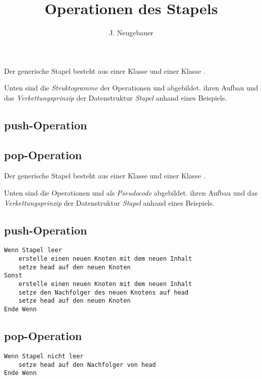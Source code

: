 \documentclass[10pt, a4paper]{scrartcl}
\author{J. Neugebauer}
\title{Operationen des Stapels}
\date{\Heute}
\begin{document}
\ReiheTitel

Der generische Stapel besteht aus einer Klasse  und einer Klasse .


\begin{aufgabe}
	Unten sind die \emph{Struktogramme} der Operationen  und  abgebildet.  ihren Aufbau und   das \emph{Verkettungsprinzip} der Datenstruktur \emph{Stapel} anhand eines Beispiels.

\subsection*{push-Operation}

\subsection*{pop-Operation}
\end{aufgabe}

\clearpage

\ReiheTitel

Der generische Stapel besteht aus einer Klasse  und einer Klasse .


\begin{aufgabe}
	Unten sind die Operationen  und  als \emph{Pseudocode} abgebildet.  ihren Aufbau und   das \emph{Verkettungsprinzip} der Datenstruktur \emph{Stapel} anhand eines Beispiels.

\subsection*{push-Operation}
\begin{lstlisting}
Wenn Stapel leer 
	erstelle einen neuen Knoten mit dem neuen Inhalt
	setze head auf den neuen Knoten
Sonst
	erstelle einen neuen Knoten mit dem neuen Inhalt
	setze den Nachfolger des neuen Knotens auf head
	setze head auf den neuen Knoten
Ende Wenn
\end{lstlisting}

\subsection*{pop-Operation}
\begin{lstlisting}
Wenn Stapel nicht leer
	setze head auf den Nachfolger von head
Ende Wenn
\end{lstlisting}
\end{aufgabe}
\end{document}
